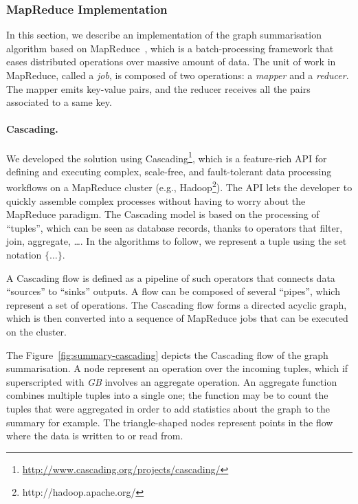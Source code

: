 \subsubsection{MapReduce Implementation}

In this section, we describe an implementation of the graph summarisation algorithm based on MapReduce~\cite{dean:2004:msd}, which is a batch-processing framework that eases distributed operations over massive amount of data. The unit of work in MapReduce, called a \emph{job}, is composed of two operations: a \emph{mapper} and a \emph{reducer}. The mapper emits key-value pairs, and the reducer receives all the pairs associated to a same key.

\paragraph{Cascading.}

We developed the solution using Cascading\footnote{\url{http://www.cascading.org/projects/cascading/}}, which is a feature-rich API for defining and executing complex, scale-free, and fault-tolerant data processing workflows on a MapReduce cluster (e.g., Hadoop\footnote{http://hadoop.apache.org/}). The API lets the developer to quickly assemble complex processes without having to worry about the MapReduce paradigm. The Cascading model is based on the processing of ``tuples'', which can be seen as database records, thanks to operators that filter, join, aggregate, \ldots.  In the algorithms to follow, we represent a tuple using the set notation $\{\ldots\}$.

A Cascading flow is defined as a pipeline of such operators that connects data ``sources'' to ``sinks'' outputs. A flow can be composed of several ``pipes'', which represent a set of operations. The Cascading flow forms a directed acyclic graph, which is then converted into a sequence of MapReduce jobs that can be executed on the cluster.

The Figure~\ref{fig:summary-cascading} depicts the Cascading flow of the graph summarisation. A node represent an operation over the incoming tuples, which if superscripted with \emph{GB} involves an aggregate operation. An aggregate function combines multiple tuples into a single one; the function may be to count the tuples that were aggregated in order to add statistics about the graph to the summary for example. The triangle-shaped nodes represent points in the flow where the data is written to or read from.


